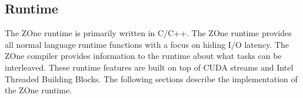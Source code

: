 
\subsection{Runtime}
The ZOne runtime is primarily written in C/C++. The ZOne runtime provides all
normal language runtime functions with a focus on hiding I/O latency. The ZOne
compiler provides information to the runtime about what tasks can be
interleaved. These runtime features are built on top of CUDA streams and 
Intel Threaded Building Blocks. The following sections describe the
implementation of the ZOne runtime.




